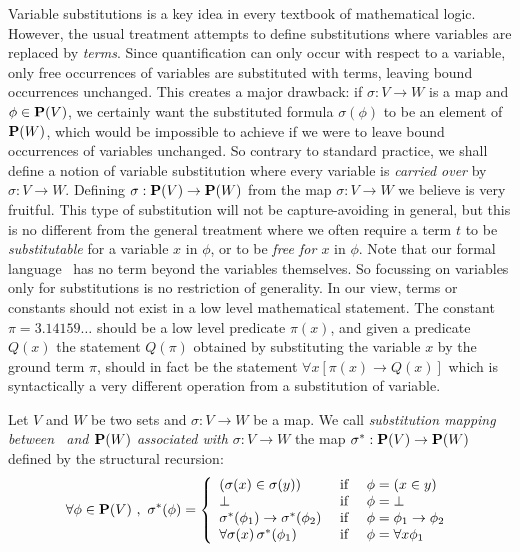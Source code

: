 Variable substitutions is a key idea in every textbook of
mathematical logic. However, the usual treatment attempts to define
substitutions where variables are replaced by {\em terms}. Since
quantification can only occur with respect to a variable, only free
occurrences of variables are substituted with terms, leaving bound
occurrences unchanged. This creates a major drawback: if
$\sigma:V\to W$ is a map and $\phi\in\mbox{${\bf P}(V)$}$, we certainly want the
substituted formula $\sigma(\phi)$ to be an element of ${\bf P}(W)$,
which would be impossible to achieve if we were to leave bound
occurrences of variables unchanged. So contrary to standard
practice, we shall define a notion of variable substitution where
every variable is {\em carried over} by $\sigma:V\to W$. Defining
$\sigma:\mbox{${\bf P}(V)$}\to{\bf P}(W)$ from the map $\sigma:V\to W$ we believe is
very fruitful. This type of substitution will not be
capture-avoiding in general, but this is no different from the
general treatment where we often require a term $t$ to be {\em
substitutable} for a variable $x$ in $\phi$, or to be {\em free for
$x$} in $\phi$. Note that our formal language \pv\ has no term
beyond the variables themselves. So focussing on variables only for
substitutions is no restriction of generality. In our view, terms or
constants should not exist in a low level mathematical statement.
The constant $\pi=3.14159\ldots$ should be a low level predicate
$\pi(x)$, and given a predicate $Q(x)$ the statement $Q(\pi)$
obtained by substituting the variable $x$ by the ground term $\pi$,
should in fact be the statement $\forall x[\pi(x)\to Q(x)]$ which is
syntactically a very different operation from a substitution of
variable. 
\begin{defin}\label{logic:def:substitution}
Let $V$ and $W$ be two sets and $\sigma:V\to W$ be a map. We call
{\em substitution mapping between \pv\ and ${\bf P}(W)$ associated
with $\sigma:V\to W$} the map $\sigma^{*}:\mbox{${\bf P}(V)$}\to{\bf P}(W)$ defined
by the structural recursion:
    \begin{equation}\label{logic:eqn:substitution:recursion}
    \forall\phi\in\pv\ ,\ \sigma^{*}(\phi)=\left\{
                    \begin{array}{lcl}
                    (\sigma(x)\in\sigma(y))&\mbox{\ if\ }&\phi=(x\in y)\\
                    \bot&\mbox{\ if\ }&\phi=\bot\\
                    \sigma^{*}(\phi_{1})\to \sigma^{*}(\phi_{2}) &\mbox{\ if\ }&\phi=\phi_{1}\to\phi_{2}\\
                    \forall\sigma(x)\,\sigma^{*}(\phi_{1})&\mbox{\ if\ }&\phi=\forall x\phi_{1}
                    \end{array}\right.
    \end{equation}
\end{defin}
